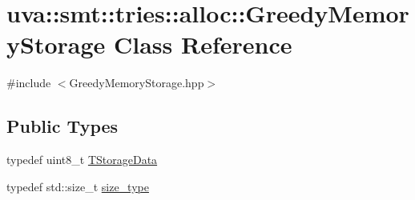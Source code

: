 \hypertarget{classuva_1_1smt_1_1tries_1_1alloc_1_1_greedy_memory_storage}{}\section{uva\+:\+:smt\+:\+:tries\+:\+:alloc\+:\+:Greedy\+Memory\+Storage Class Reference}
\label{classuva_1_1smt_1_1tries_1_1alloc_1_1_greedy_memory_storage}


{\ttfamily \#include $<$Greedy\+Memory\+Storage.\+hpp$>$}

\subsection*{Public Types}
\begin{DoxyCompactItemize}
\item 
typedef uint8\+\_\+t \hyperlink{classuva_1_1smt_1_1tries_1_1alloc_1_1_greedy_memory_storage_a382ab7e2f6a10ec5da8de9d836f34f32}{T\+Storage\+Data}
\item 
typedef std\+::size\+\_\+t \hyperlink{classuva_1_1smt_1_1tries_1_1alloc_1_1_greedy_memory_storage_a15b9139bffa854a165a11131725fa903}{size\+\_\+type}
\end{DoxyCompactItemize}
